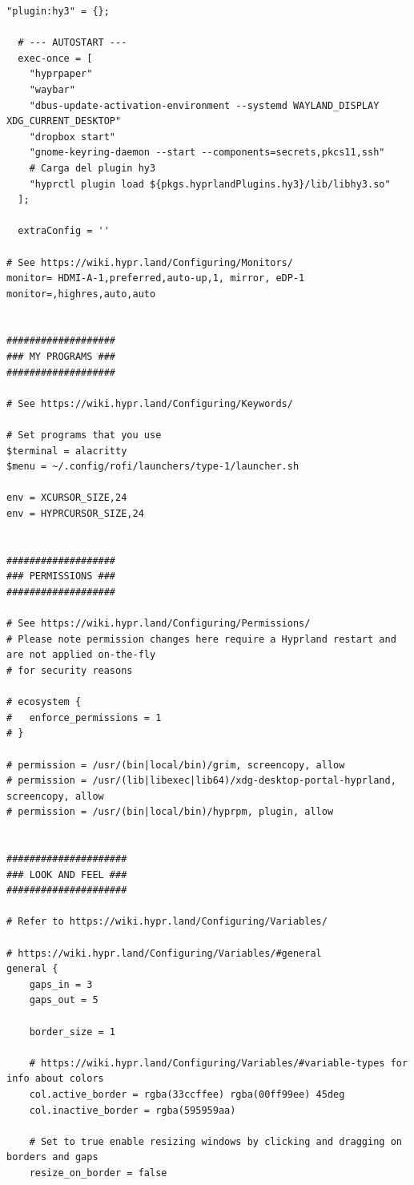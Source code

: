 \documentclass[11pt]{article}
\begin{document}
\begin{verbatim}
"plugin:hy3" = {};

  # --- AUTOSTART ---
  exec-once = [
    "hyprpaper"
    "waybar"
    "dbus-update-activation-environment --systemd WAYLAND_DISPLAY XDG_CURRENT_DESKTOP"
    "dropbox start"
    "gnome-keyring-daemon --start --components=secrets,pkcs11,ssh"
    # Carga del plugin hy3
    "hyprctl plugin load ${pkgs.hyprlandPlugins.hy3}/lib/libhy3.so"
  ];

  extraConfig = ''

# See https://wiki.hypr.land/Configuring/Monitors/
monitor= HDMI-A-1,preferred,auto-up,1, mirror, eDP-1
monitor=,highres,auto,auto


###################
### MY PROGRAMS ###
###################

# See https://wiki.hypr.land/Configuring/Keywords/

# Set programs that you use
$terminal = alacritty
$menu = ~/.config/rofi/launchers/type-1/launcher.sh

env = XCURSOR_SIZE,24
env = HYPRCURSOR_SIZE,24


###################
### PERMISSIONS ###
###################

# See https://wiki.hypr.land/Configuring/Permissions/
# Please note permission changes here require a Hyprland restart and are not applied on-the-fly
# for security reasons

# ecosystem {
#   enforce_permissions = 1
# }

# permission = /usr/(bin|local/bin)/grim, screencopy, allow
# permission = /usr/(lib|libexec|lib64)/xdg-desktop-portal-hyprland, screencopy, allow
# permission = /usr/(bin|local/bin)/hyprpm, plugin, allow


#####################
### LOOK AND FEEL ###
#####################

# Refer to https://wiki.hypr.land/Configuring/Variables/

# https://wiki.hypr.land/Configuring/Variables/#general
general {
    gaps_in = 3
    gaps_out = 5

    border_size = 1

    # https://wiki.hypr.land/Configuring/Variables/#variable-types for info about colors
    col.active_border = rgba(33ccffee) rgba(00ff99ee) 45deg
    col.inactive_border = rgba(595959aa)

    # Set to true enable resizing windows by clicking and dragging on borders and gaps
    resize_on_border = false


\end{verbatim}
\end{document}
